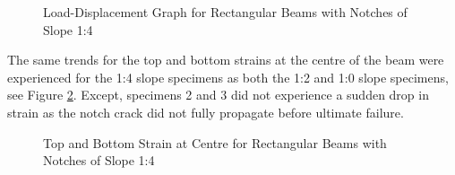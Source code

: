 \documentclass[11pt,a4paper]{article}
\numberwithin{equation}{subsection}
\begin{document}
\begin{figure}[h]
	\begin{center}
	\end{center}
	\caption{Load-Displacement Graph for Rectangular Beams with Notches of Slope 1:4}
	\label{fig:Rect_14_def}
\end{figure}

\noindent
The same trends for the top and bottom strains at the centre of the beam were experienced for the 1:4 slope specimens as both the 1:2 and 1:0 slope specimens, see Figure \ref{fig:Rect_14_centre}. Except, specimens 2 and 3 did not experience a sudden drop in strain as the notch crack did not fully propagate before ultimate failure. 

\begin{figure}[h]
	\begin{center}
	\end{center}
	\caption{Top and Bottom Strain at Centre for Rectangular Beams with Notches of Slope 1:4}
	\label{fig:Rect_14_centre}
\end{figure}
\end{document}
